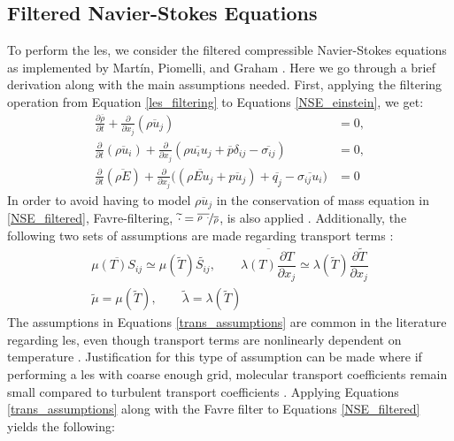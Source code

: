 \subsection{Filtered Navier-Stokes Equations}
To perform the \gls{les}, we consider the filtered compressible Navier-Stokes equations as implemented by Mart\'{i}n, Piomelli, and Graham \cite{LES_Comp}. Here we go through a brief derivation along with the main assumptions needed. First, applying the filtering operation from Equation \eqref{les_filtering} to Equations \eqref{NSE_einstein}, we get:
\begin{subequations} \label{NSE_filtered}
\begin{align}
  \frac{\partial\overline{\rho}}{\partial t} + \frac{\partial }{\partial x_j} \left( \overline{\rho u_j} \right) &= 0,  \label{mass_filtered} \\
  \frac{\partial}{\partial t} \left( \overline{\rho u_i }\right) + \frac{\partial}{\partial x_j} \left(\overline{\rho u_i u_j} + \overline{p }\delta_{ij} - \overline{\sigma_{ij}} \right) &= 0,  \label{mom_filtered} \\
  \frac{\partial}{\partial t} \left( \overline{\rho E} \right) + \frac{\partial}{\partial x_j} \big(\left( \overline{\rho Eu_j}+\overline{p u_j} \right) + \overline{q_j} - \overline{\sigma_{ij} u_i}\big) &= 0 \label{en_filtered}
\end{align}
\end{subequations}
In order to avoid having to model $\overline{\rho u_j} $ in the conservation of mass equation in \eqref{NSE_filtered}, Favre-filtering, $\widetilde{\cdot}  = \nicefrac{\overline{\rho~\cdot}}{\overline{\rho}}$, is also applied \cite{favre}. Additionally, the following two sets of assumptions are made regarding transport terms \cite{PIOMELLI202183}:
\begin{subequations} \label{trans_assumptions}
\begin{align}
\overline{\mu(T)S_{ij}} \simeq \mu(\widetilde{T})\widetilde{S_{ij}}, \quad \quad 
\overline{\lambda(T)\dfrac{\partial T}{\partial x_j}} \simeq \lambda(\widetilde{T})\dfrac{ \partial \widetilde{T}}{\partial x_j} \label{trans_1}\\
\widetilde{\mu} = \mu(\widetilde{T}), \quad \quad \widetilde{\lambda} = \lambda(\widetilde{T}) \label{trans_2}
\end{align}
\end{subequations}
The assumptions in Equations \eqref{trans_assumptions} are common in the literature regarding \gls{les}, even though transport terms are nonlinearly dependent on temperature \cite{PIOMELLI202183}. Justification for this type of assumption can be made where if performing a \gls{les} with coarse enough grid, molecular transport coefficients remain small compared to turbulent transport coefficients \cite{}. Applying Equations \eqref{trans_assumptions} along with the Favre filter to Equations \eqref{NSE_filtered} yields the following:
